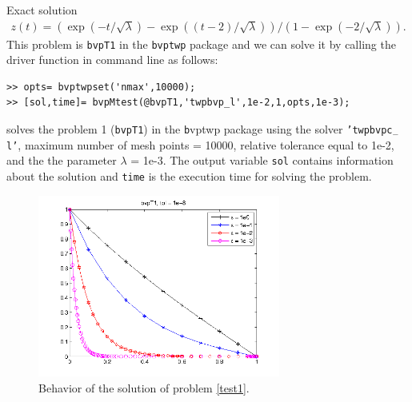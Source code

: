 \documentclass[<options>]{article}
\begin{document}
Exact solution
\begin{equation*}
\begin{matrix}
z(t) = (\exp(-t/\sqrt \lambda) - \exp((t-2)/\sqrt \lambda)) / (1 - \exp(-2/\sqrt \lambda)).
\end{matrix}
\end{equation*}
This problem is \texttt{bvpT1}  in the \texttt{bvptwp}  package and we can solve
it by calling the driver function in command line as follows:
\begin{verbatim}
>> opts= bvptwpset('nmax',10000);
>> [sol,time]= bvpMtest(@bvpT1,'twpbvp_l',1e-2,1,opts,1e-3);
\end{verbatim}
solves the problem 1 (\texttt{bvpT1})  in the \texttt bvptwp  package using the solver
\texttt{'twpbvpc$_{-}$l'}, maximum number of mesh points = 10000, relative
tolerance equal to 1e-2, and the the parameter $\lambda$ = 1e-3. The output
variable \texttt{sol}  contains information about the solution and \texttt{time}  is
the execution time for solving the problem.\\ \begin{figure}[htb]
\centerline{\includegraphics[height=6cm]{Prob1}}
\caption{Behavior of the solution of problem \ref{test1}.}
\end{figure}



\newpage
\end{document}
